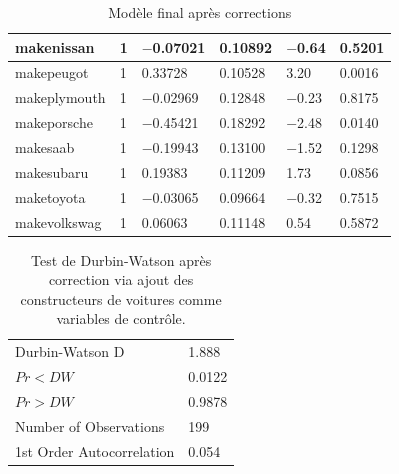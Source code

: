 \documentclass[11pt,a4paper]{article}
\begin{document}
\begin{table}
\begin{tabulary}{1\textwidth}{LLLLLL}
	makenissan &       1 &    $-$0.07021 &    0.10892 &    $-$0.64 &    0.5201\\\hline
	makepeugot &       1 &    0.33728 &    0.10528 &    3.20 &    0.0016\\\hline
	makeplymouth &      1 &    $-$0.02969 &    0.12848 &    $-$0.23 &    0.8175\\\hline
	makeporsche &        1 &    $-$0.45421 &    0.18292 &    $-$2.48 &    0.0140\\\hline
	makesaab &       1 &    $-$0.19943 &    0.13100 &    $-$1.52 &    0.1298\\\hline
	makesubaru &       1 &    0.19383 &    0.11209 &    1.73 &    0.0856\\\hline
	maketoyota &       1 &    $-$0.03065 &    0.09664 &    $-$0.32 &    0.7515\\\hline
	makevolkswag &        1 &    0.06063 &    0.11148 &    0.54 &    0.5872\\\hline
\end{tabulary}
	\caption{Modèle final après corrections}
	\label{table:Modfinal}
\end{table}

\begin{table}
	\scriptsize
	\centering
	\begin{tabulary}{1\textwidth}{LL}\hline
		Durbin-Watson D &    1.888\\
		$Pr < DW$ &    0.0122\\
		$Pr > DW$ &    0.9878\\
		Number of Observations &    199\\
		1st Order Autocorrelation &    0.054\\\hline
	\end{tabulary}
	\caption{Test de Durbin-Watson après correction via ajout des constructeurs de voitures comme variables de contrôle.}
	\label{table:dwcorrected}
\end{table}
\end{document}
